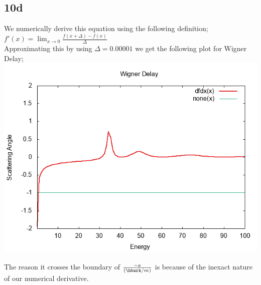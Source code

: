 \documentclass{article}
\begin{document}
\subsection*{10d}

We numerically derive this equation using the following definition;\\

$f'(x)=\lim_{x\rightarrow0}\frac{f(x+\Delta)-f(x)}{\Delta}$\\

Approximating this by using $\Delta=0.00001$ we get the following plot for Wigner Delay;\\
\includegraphics[width=\textwidth]{lastdfdx_tru.png}

The reason it crosses the boundary of $\frac{-a}{(\hbark/m)}$ is because of the inexact nature of our numerical derivative.\\
\end{document}
